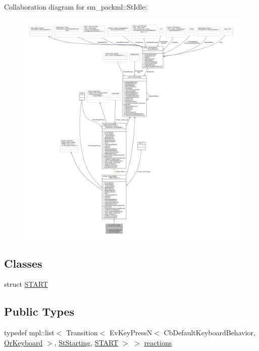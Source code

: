 Collaboration diagram for sm\+\_\+packml\+:\+:St\+Idle\+:
\nopagebreak
\begin{figure}[H]
\begin{center}
\leavevmode
\includegraphics[width=350pt]{structsm__packml_1_1StIdle__coll__graph}
\end{center}
\end{figure}
\subsection*{Classes}
\begin{DoxyCompactItemize}
\item 
struct \hyperlink{structsm__packml_1_1StIdle_1_1START}{S\+T\+A\+RT}
\end{DoxyCompactItemize}
\subsection*{Public Types}
\begin{DoxyCompactItemize}
\item 
typedef mpl\+::list$<$ Transition$<$ Ev\+Key\+PressN$<$ Cb\+Default\+Keyboard\+Behavior, \hyperlink{classsm__packml_1_1OrKeyboard}{Or\+Keyboard} $>$, \hyperlink{structsm__packml_1_1StStarting}{St\+Starting}, \hyperlink{structsm__packml_1_1StIdle_1_1START}{S\+T\+A\+RT} $>$ $>$ \hyperlink{structsm__packml_1_1StIdle_abcbcf0e43c5a244b09d3a449e51e9524}{reactions}
\end{DoxyCompactItemize}
